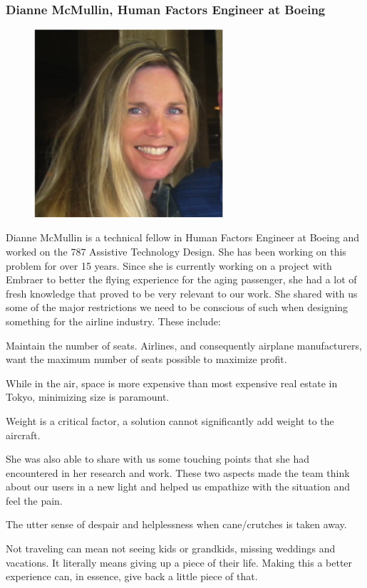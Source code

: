 \documentclass[a4paper, 12pt,conference]{new_cit_thesis}
\begin{document}
\subsubsection{Dianne McMullin, Human Factors Engineer at Boeing}
\begin{figure}[h]
  \centering
     \includegraphics[width=7cm]{images/image020}
  \label{fig:20}
\end{figure}

Dianne McMullin is a technical fellow in Human Factors Engineer at Boeing and worked on the 787 Assistive Technology Design.  She has been working on this problem for over 15 years.  Since she is currently working on a project with Embraer to better the flying experience for the aging passenger, she had a lot of fresh knowledge that proved to be very relevant to our work. She shared with us some of the major restrictions we need to be conscious of such when designing something for the airline industry. These include:	
\begin{list}{-}{}
  \item Maintain the number of seats. Airlines, and consequently airplane manufacturers, want the maximum number of seats possible to maximize profit.
  \item While in the air, space is more expensive than most expensive real estate in Tokyo, minimizing size is paramount.
  \item Weight is a critical factor, a solution cannot significantly add weight to the aircraft.
\end{list}

She was also able to share with us some touching points that she had encountered in her research and work.  These two aspects made the team think about our users in a new light and helped us empathize with the situation and feel the pain.  

\begin{list}{-}{}
  \item The utter sense of despair and helplessness when cane/crutches is taken away.
  \item Not traveling can mean not seeing kids or grandkids, missing weddings and vacations. It literally means giving up a piece of their life. Making this a better experience can, in essence, give back a little piece of that.
\end{list}
\end{document}
